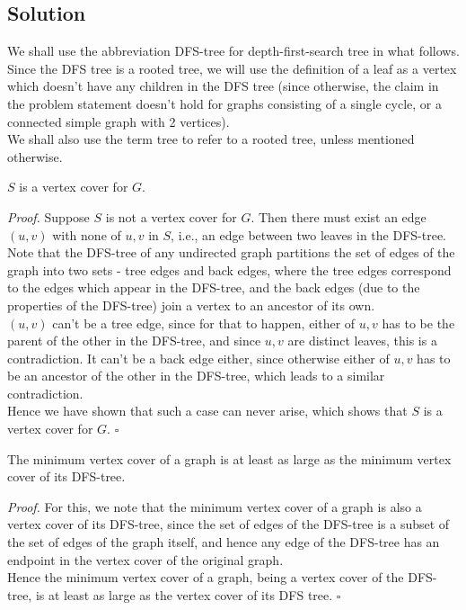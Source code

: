 \documentclass[a4paper]{article}
\newenvironment{proof}{\begin{breakbox}\textit{Proof.}}{\hfill$\square$\end{breakbox}}
\newcommand{\nl}{\vspace{0.2cm}\\}
\begin{document}
\subsection{Solution}
We shall use the abbreviation DFS-tree for depth-first-search tree in what follows.\nl
Since the DFS tree is a rooted tree, we will use the definition of a leaf as a vertex which doesn't have any children in the DFS tree (since otherwise, the claim in the problem statement doesn't
hold for graphs consisting of a single cycle, or a connected simple graph with 2 vertices).\nl
We shall also use the term tree to refer to a rooted tree, unless mentioned otherwise.\nl
\begin{claim}
    $S$ is a vertex cover for $G$.
\end{claim}
\begin{proof}
    Suppose $S$ is not a vertex cover for $G$. Then there must exist an edge $(u, v)$ with none of $u, v$ in $S$, i.e., an edge between two leaves in the DFS-tree.\nl
    Note that the DFS-tree of any undirected graph partitions the set of edges of the graph into two sets - tree edges and back edges, where the tree edges correspond to the edges which appear in
    the DFS-tree, and the back edges (due to the properties of the DFS-tree) join a vertex to an ancestor of its own.\nl
    $(u, v)$ can't be a tree edge, since for that to happen, either of $u, v$ has to be the parent of the other in the DFS-tree, and since $u, v$ are distinct leaves, this is a contradiction. It can't be a back edge
    either, since otherwise either of $u, v$ has to be an ancestor of the other in the DFS-tree, which leads to a similar contradiction.\nl
    Hence we have shown that such a case can never arise, which shows that $S$ is a vertex cover for $G$.
\end{proof}
\begin{claim}
    The minimum vertex cover of a graph is at least as large as the minimum vertex cover of its DFS-tree.
\end{claim}
\begin{proof}
    For this, we note that the minimum vertex cover of a graph is also a vertex cover of its DFS-tree, since the set of edges of the DFS-tree is a subset of the set of edges of the graph itself, and
    hence any edge of the DFS-tree has an endpoint in the vertex cover of the original graph.\nl
    Hence the minimum vertex cover of a graph, being a vertex cover of the DFS-tree, is at least as large as the vertex cover of its DFS tree.
\end{proof}
\end{document}
